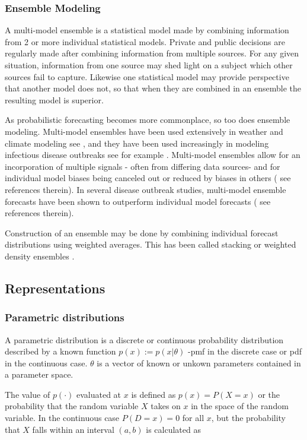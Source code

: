 \documentclass{article}\usepackage[]{graphicx}\usepackage[]{color}
\begin{document}
\subsubsection{Ensemble Modeling}
A multi-model ensemble is a statistical model made by combining information from
2 or more individual statistical models. Private and public decisions are 
regularly made after combining information from multiple sources. For any given
situation, information from one source may shed light on a subject which other
sources fail to capture. Likewise one statistical model may provide perspective
that another model does not, so that when they are combined in an ensemble the 
resulting model is superior.

As probabilistic forecasting becomes more commonplace, so too does ensemble 
modeling. Multi-model ensembles have been used extensively in weather and
climate modeling see \cite{baran2018combining}, 
and they have been used increasingly in modeling infectious disease outbreaks
see for example \cite{yamana2016superensemble}. 
Multi-model ensembles allow for an incorporation of multiple signals -
often from differing data sources- and for individual model biases being canceled
out or reduced by biases in others (\cite{reich2019accuracy} see references
therein). 
In several disease outbreak studies, multi-model ensemble forecasts have been 
shown to outperform individual model forecasts (\cite{cramer2021evaluation} see
references therein).

Construction of an ensemble may be done by combining individual forecast 
distributions using weighted averages. This has been called stacking 
\cite{wolpert1992stacked} or weighted density ensembles 
\cite{ray2018prediction}. 

\subsection{Representations}
\subsubsection{Parametric distributions}
A parametric distribution is a discrete or continuous probability distribution 
described by a known function $p(x) := p(x|\theta)$ -pmf in the discrete case or 
pdf in the continuous case. $\theta$ is a vector of known or unkown parameters 
contained in a parameter space. 

The value of $p(\cdot)$ evaluated at $x$ is defined as 
$p(x) = P(X = x)$ or the probability that the random variable $X$ takes
on $x$ in the space of the random variable. In the continuous case 
$P(D = x) = 0$ for all $x$, but the probability 
that $X$ falls within an interval $(a,b)$ is calculated as
\end{document}
